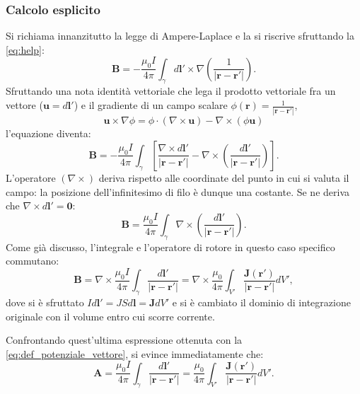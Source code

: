 \documentclass[a4paper,11pt]{report}
\begin{document}
\subsubsection{Calcolo esplicito}
Si richiama innanzitutto la legge di Ampere-Laplace e la si riscrive sfruttando la \eqref{eq:help}:
\begin{equation}
    \bm{B} = -\frac{\mu_0 I}{4\pi} \int_{\gamma} d\bm{l}' \times \nabla \left( \frac{1}{|\bm{r}-\bm{r}'|} \right).
\end{equation}
Sfruttando una nota identità vettoriale che lega il prodotto vettoriale fra un vettore ($\bm{u} = d\bm{l}'$) e il gradiente di un campo scalare $\phi(\bm{r}) = \frac{1}{|\bm{r}-\bm{r}'|}$,
\begin{equation}
    \bm{u} \times \nabla \phi = \phi \cdot (\nabla \times \bm{u}) - \nabla \times (\phi \bm{u})
\end{equation}
l'equazione diventa:
\begin{equation}
    \bm{B} = -\frac{\mu_0 I}{4\pi} \int_{\gamma}\left[ \frac{\nabla \times d\bm{l}'}{|\bm{r}-\bm{r}'|}  - \nabla \times \left( \frac{d\bm{l}'}{|\bm{r}-\bm{r}'|}\right)\right].
\end{equation}
L'operatore $(\nabla \times)$ deriva rispetto alle coordinate del punto in cui si valuta il campo: la posizione dell'infinitesimo di filo è dunque una costante. Se ne deriva che $\nabla \times d\bm{l}' = \bm{0}$:
\begin{equation}
    \bm{B} = \frac{\mu_0 I}{4\pi} \int_{\gamma} \nabla \times \left( \frac{d\bm{l}'}{|\bm{r}-\bm{r}'|}\right).
\end{equation}
Come già discusso, l'integrale e l'operatore di rotore in questo caso specifico commutano:
\begin{equation}
    \bm{B} = \nabla \times \frac{\mu_0 I}{4\pi} \int_{\gamma}  \frac{d\bm{l}'}{|\bm{r}-\bm{r}'|} = \nabla \times \frac{\mu_0}{4\pi} \int_{V'} \frac{\bm{J}(\bm{r}')}{|\bm{r} - \bm{r}'|} dV',
    \label{eq:soluzione_A}
\end{equation}
dove si è sfruttato $Id\bm{l}' = JSd\bm{l} = \bm{J}dV'$ e si è cambiato il dominio di integrazione originale con il volume entro cui scorre corrente. 

Confrontando  quest'ultima espressione ottenuta con la \eqref{eq:def_potenziale_vettore}, si evince immediatamente che:
\begin{equation}
    \bm{A} = \frac{\mu_0 I}{4\pi} \int_{\gamma}  \frac{d\bm{l}'}{|\bm{r}-\bm{r}'|} = \frac{\mu_0}{4\pi} \int_{V'} \frac{\bm{J}(\bm{r}')}{|\bm{r} - \bm{r}'|} dV'.
    \end{equation}
    
\end{document}
